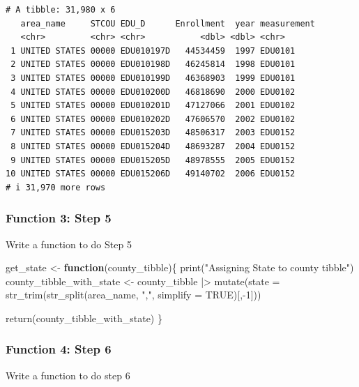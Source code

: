 \documentclass[
  letterpaper,
  DIV=11,
  numbers=noendperiod]{scrartcl}
\newenvironment{Shaded}{\begin{snugshade}}{\end{snugshade}}
\newcommand{\AttributeTok}[1]{\textcolor[rgb]{0.40,0.45,0.13}{#1}}
\newcommand{\ConstantTok}[1]{\textcolor[rgb]{0.56,0.35,0.01}{#1}}
\newcommand{\ControlFlowTok}[1]{\textcolor[rgb]{0.00,0.23,0.31}{\textbf{#1}}}
\newcommand{\DecValTok}[1]{\textcolor[rgb]{0.68,0.00,0.00}{#1}}
\newcommand{\FunctionTok}[1]{\textcolor[rgb]{0.28,0.35,0.67}{#1}}
\newcommand{\NormalTok}[1]{\textcolor[rgb]{0.00,0.23,0.31}{#1}}
\newcommand{\OtherTok}[1]{\textcolor[rgb]{0.00,0.23,0.31}{#1}}
\newcommand{\SpecialCharTok}[1]{\textcolor[rgb]{0.37,0.37,0.37}{#1}}
\newcommand{\StringTok}[1]{\textcolor[rgb]{0.13,0.47,0.30}{#1}}
\begin{document}
\begin{verbatim}
# A tibble: 31,980 x 6
   area_name     STCOU EDU_D      Enrollment  year measurement
   <chr>         <chr> <chr>           <dbl> <dbl> <chr>      
 1 UNITED STATES 00000 EDU010197D   44534459  1997 EDU0101    
 2 UNITED STATES 00000 EDU010198D   46245814  1998 EDU0101    
 3 UNITED STATES 00000 EDU010199D   46368903  1999 EDU0101    
 4 UNITED STATES 00000 EDU010200D   46818690  2000 EDU0102    
 5 UNITED STATES 00000 EDU010201D   47127066  2001 EDU0102    
 6 UNITED STATES 00000 EDU010202D   47606570  2002 EDU0102    
 7 UNITED STATES 00000 EDU015203D   48506317  2003 EDU0152    
 8 UNITED STATES 00000 EDU015204D   48693287  2004 EDU0152    
 9 UNITED STATES 00000 EDU015205D   48978555  2005 EDU0152    
10 UNITED STATES 00000 EDU015206D   49140702  2006 EDU0152    
# i 31,970 more rows
\end{verbatim}

\subsubsection{Function 3: Step 5}\label{function-3-step-5}

Write a function to do Step 5

\begin{Shaded}
\begin{Highlighting}[]
\NormalTok{get\_state }\OtherTok{\textless{}{-}} \ControlFlowTok{function}\NormalTok{(county\_tibble)\{}
  \FunctionTok{print}\NormalTok{(}\StringTok{"Assigning State to county tibble"}\NormalTok{)}
\NormalTok{  county\_tibble\_with\_state }\OtherTok{\textless{}{-}}\NormalTok{ county\_tibble }\SpecialCharTok{|\textgreater{}} 
  \FunctionTok{mutate}\NormalTok{(}\AttributeTok{state =} \FunctionTok{str\_trim}\NormalTok{(}\FunctionTok{str\_split}\NormalTok{(area\_name, }\StringTok{","}\NormalTok{, }\AttributeTok{simplify =} \ConstantTok{TRUE}\NormalTok{)[,}\SpecialCharTok{{-}}\DecValTok{1}\NormalTok{]))}
  
  \FunctionTok{return}\NormalTok{(county\_tibble\_with\_state)}
\NormalTok{\}}
\end{Highlighting}
\end{Shaded}

\subsubsection{Function 4: Step 6}\label{function-4-step-6}

Write a function to do step 6
\end{document}

